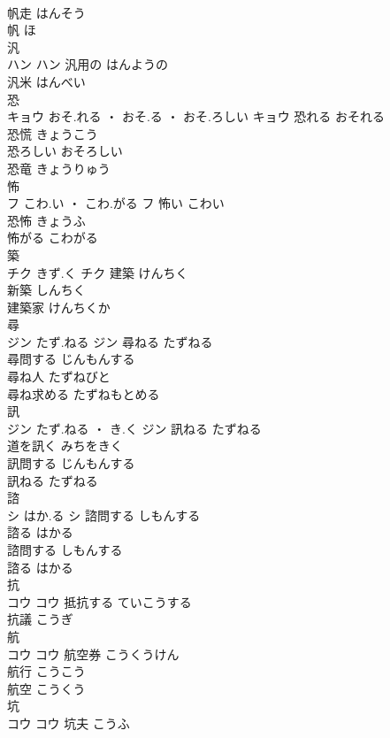 \documentclass[8pt]{extreport}
\begin{document}
\begin{CJK}{UTF8}{min}
\\	帆走	はんそう	
\\	帆	ほ	
\\	汎	
\\	ハン		ハン	汎用の	はんようの	
\\	汎米	はんべい	
\\	恐	
\\	キョウ	おそ.れる ・ おそ.る ・ おそ.ろしい	キョウ	恐れる	おそれる	
\\	恐慌	きょうこう	
\\	恐ろしい	おそろしい	
\\	恐竜	きょうりゅう	
\\	怖	
\\	フ	こわ.い ・ こわ.がる	フ													怖い	こわい	
\\	恐怖	きょうふ	
\\	怖がる	こわがる	
\\	築	
\\	チク	きず.く	チク	建築	けんちく	
\\	新築	しんちく	
\\	建築家	けんちくか	
\\	尋	
\\	ジン	たず.ねる	ジン	尋ねる	たずねる	
\\	尋問する	じんもんする	
\\	尋ね人	たずねびと	
\\	尋ね求める	たずねもとめる	
\\	訊	
\\	ジン	たず.ねる ・ き.く	ジン	訊ねる	たずねる	
\\	道を訊く	みちをきく	
\\	訊問する	じんもんする	
\\	訊ねる	たずねる	
\\	諮	
\\	シ	はか.る	シ	諮問する	しもんする	
\\	諮る	はかる	
\\	諮問する	しもんする	
\\	諮る	はかる	
\\	抗	
\\	コウ		コウ	抵抗する	ていこうする	
\\	抗議	こうぎ	
\\	航	
\\	コウ		コウ	航空券	こうくうけん	
\\	航行	こうこう	
\\	航空	こうくう	
\\	坑	
\\	コウ		コウ													坑夫	こうふ	

\end{CJK}
\end{document}
